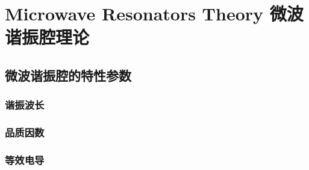 \chapter{Microwave Resonators Theory 微波谐振腔理论}
\setlength{\parindent}{2\ccwd}
\section{微波谐振腔的特性参数}
    \subsection{谐振波长}
    \subsection{品质因数}
    \subsection{等效电导}


